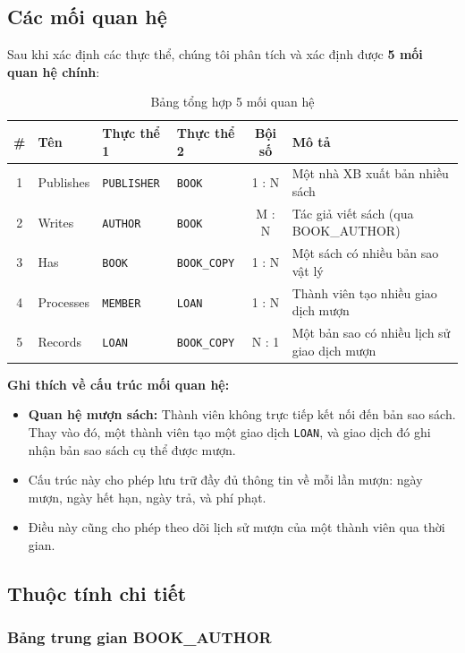 \documentclass[12pt,a4paper]{article}
\newcommand{\entity}[1]{\texttt{#1}}
\begin{document}
\subsection{Các mối quan hệ}

Sau khi xác định các thực thể, chúng tôi phân tích và xác định được \textbf{5 mối quan hệ chính}:

\begin{table}[H]
\centering
\caption{Bảng tổng hợp 5 mối quan hệ}
\begin{tabular}{|c|l|l|l|c|p{5cm}|}
\hline
\textbf{\#} & \textbf{Tên} & \textbf{Thực thể 1} & \textbf{Thực thể 2} & \textbf{Bội số} & \textbf{Mô tả} \\ \hline
1 & Publishes & \entity{PUBLISHER} & \entity{BOOK} & 1 : N & Một nhà XB xuất bản nhiều sách \\ \hline
2 & Writes & \entity{AUTHOR} & \entity{BOOK} & M : N & Tác giả viết sách (qua BOOK\_AUTHOR) \\ \hline
3 & Has & \entity{BOOK} & \entity{BOOK\_COPY} & 1 : N & Một sách có nhiều bản sao vật lý \\ \hline
4 & Processes & \entity{MEMBER} & \entity{LOAN} & 1 : N & Thành viên tạo nhiều giao dịch mượn \\ \hline
5 & Records & \entity{LOAN} & \entity{BOOK\_COPY} & N : 1 & Một bản sao có nhiều lịch sử giao dịch mượn \\ \hline
\end{tabular}
\end{table}


\textbf{Ghi thích về cấu trúc mối quan hệ:}

\begin{itemize}
    \item \textbf{Quan hệ mượn sách:} Thành viên không trực tiếp kết nối đến bản sao sách. Thay vào đó, một thành viên tạo một giao dịch \entity{LOAN}, và giao dịch đó ghi nhận bản sao sách cụ thể được mượn.
    \item Cấu trúc này cho phép lưu trữ đầy đủ thông tin về mỗi lần mượn: ngày mượn, ngày hết hạn, ngày trả, và phí phạt.
    \item Điều này cũng cho phép theo dõi lịch sử mượn của một thành viên qua thời gian.
\end{itemize}

\subsection{Thuộc tính chi tiết}

\subsubsection{Bảng trung gian BOOK\_AUTHOR}
\end{document}
